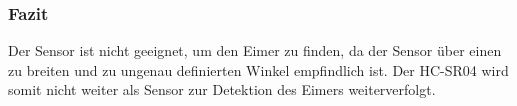 \subsubsection{Fazit}
Der Sensor ist nicht geeignet, um den Eimer zu finden, da der Sensor über 
einen zu breiten und zu ungenau definierten Winkel empfindlich ist. Der 
HC-SR04 wird somit nicht weiter als Sensor zur Detektion des Eimers 
weiterverfolgt. 

